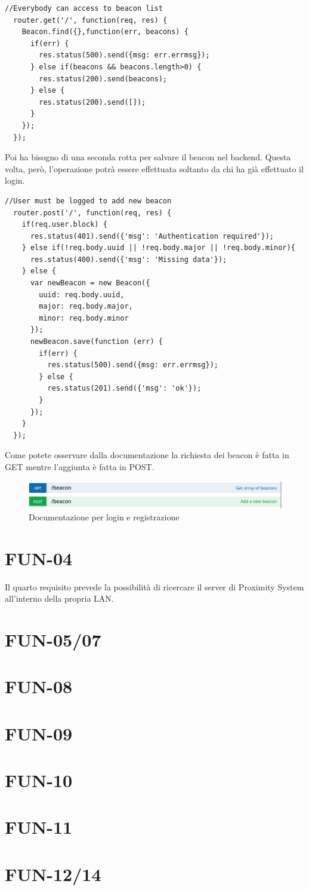 \begin{lstlisting}[caption={/webserver/app/routes/beacon.js get}, style=javaScriptCode]
  //Everybody can access to beacon list
  router.get('/', function(req, res) {
    Beacon.find({},function(err, beacons) {
      if(err) {
        res.status(500).send({msg: err.errmsg});
      } else if(beacons && beacons.length>0) {
        res.status(200).send(beacons);
      } else {
        res.status(200).send([]);
      }
    });
  });
\end{lstlisting}
Poi ha bisogno di una seconda rotta per salvare il beacon nel backend.
Questa volta, però, l'operazione potrà essere effettuata soltanto da chi ha già effettuato il login.
\begin{lstlisting}[caption={/webserver/app/routes/beacon.js aggiunta}, style=javaScriptCode]
  //User must be logged to add new beacon
  router.post('/', function(req, res) {
    if(req.user.block) {
      res.status(401).send({'msg': 'Authentication required'});
    } else if(!req.body.uuid || !req.body.major || !req.body.minor){
      res.status(400).send({'msg': 'Missing data'});
    } else {
      var newBeacon = new Beacon({
        uuid: req.body.uuid,
        major: req.body.major,
        minor: req.body.minor
      });
      newBeacon.save(function (err) {
        if(err) {
          res.status(500).send({msg: err.errmsg});
        } else {
          res.status(201).send({'msg': 'ok'});
        }
      });
    }
  });
\end{lstlisting}

Come potete osservare dalla documentazione la richiesta dei beacon è fatta in GET mentre l'aggiunta è fatta in POST.

\begin{figure}[h]
\centering
\includegraphics[width=1\textwidth]{API/beacon_03.png} 
\caption{Documentazione per login e registrazione}
\label{fig:user:login}
\end{figure}

\section{FUN-04}
Il quarto requisito prevede la possibilità di ricercare il server di Proximity System all'interno della propria LAN.

\section{FUN-05/07}
\section{FUN-08}
\section{FUN-09}
\section{FUN-10}
\section{FUN-11}
\section{FUN-12/14}